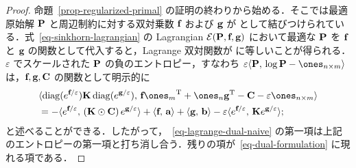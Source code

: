 \begin{proof}
命題~\ref{prop-regularized-primal} の証明の終わりから始める．そこでは最適原始解 $\P$ と周辺制約に対する双対乗数 $\fD$ および $\gD$ が
として結びつけられている．式~\eqref{eq-sinkhorn-lagrangian} の Lagrangian $\Lag(\P,\fD,\gD)$ において最適な $\P$ を $\fD$ と $\gD$ の関数として代入すると，Lagrange 双対関数が
に等しいことが得られる．$\varepsilon$ でスケールされた $\P$ の負のエントロピー，すなわち $\varepsilon \dotp{\P}{\log \P - \ones_{n\times m}}$ は，$\fD,\gD, \C$ の関数として明示的に
\begin{align*}
&\dotp{\diag(e^{\fD/\varepsilon}) \K \diag(e^{\gD/\varepsilon})}{\fD\transp{\ones_m}+\ones_n\transp{\gD}-\C-\varepsilon\ones_{n\times m}}\\
&= -\dotp{e^{\fD/\varepsilon}}{\left(\K\odot \C\right)e^{\gD/\varepsilon}} + \dotp{\fD}{\a}+ \dotp{\gD}{\b}-\varepsilon \dotp{e^{\fD/\varepsilon}}{\K e^{\gD/\varepsilon}};
\end{align*}
と述べることができる．したがって，~\eqref{eq-lagrange-dual-naive} の第一項は上記のエントロピーの第一項と打ち消し合う．残りの項が~\eqref{eq-dual-formulation} に現れる項である．
\end{proof}



